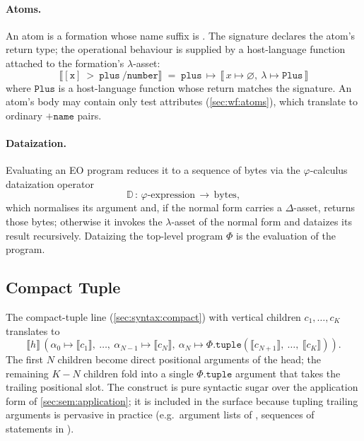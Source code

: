 \paragraph{Atoms.}
An atom is a formation whose name suffix is .
The signature  declares the atom's return type;
  the operational behaviour is supplied by a host-language function
  attached to the formation's $\lambda$-asset:
\begin{equation*}
  \llbracket \mathtt{[x]\ >\ plus\ /number} \rrbracket\;=\;
    \mathtt{plus}\,\mapsto\,
    \llbracket\,
      x \mapsto \varnothing,\
      \lambda \mapsto \mathtt{Plus}
    \,\rrbracket
\end{equation*}
where $\mathtt{Plus}$ is a host-language function whose return matches
  the signature.
An atom's body may contain only test attributes (\cref{sec:wf:atoms}),
  which translate to ordinary $\mathtt{+name}$ pairs.

\paragraph{Dataization.}
Evaluating an EO program reduces it to a sequence of bytes via the
  \(\varphi\)-calculus dataization operator
\begin{equation*}
  \mathbb{D}\,:\,\varphi\text{-expression}\,\to\,\text{bytes},
\end{equation*}
which normalises its argument and, if the normal form carries a
  $\Delta$-asset, returns those bytes;
  otherwise it invokes the $\lambda$-asset of the normal form and
  dataizes its result recursively.
Dataizing the top-level program $\Phi$ is the evaluation of the program.

\subsection{Compact Tuple}\label{sec:sem:tuple}

The compact-tuple line  (\cref{sec:syntax:compact})
  with vertical children \(c_1, \ldots, c_K\) translates to
\begin{equation*}
  \llbracket h \rrbracket\,(
    \alpha_0 \mapsto \llbracket c_1 \rrbracket,\ \ldots,\
    \alpha_{N-1} \mapsto \llbracket c_N \rrbracket,\
    \alpha_N \mapsto \Phi.\mathtt{tuple}(
      \llbracket c_{N+1} \rrbracket,\ \ldots,\ \llbracket c_K \rrbracket
    )
  ).
\end{equation*}
The first \(N\) children become direct positional arguments of the head;
  the remaining \(K - N\) children fold into a single
  \(\Phi.\mathtt{tuple}\) argument that takes the trailing positional
  slot.
The construct is pure syntactic sugar over the application form of
  \cref{sec:sem:application};
  it is included in the surface because tupling trailing arguments is
  pervasive in practice
  (e.g.\ argument lists of , sequences of statements in
  \ff{seq}).

